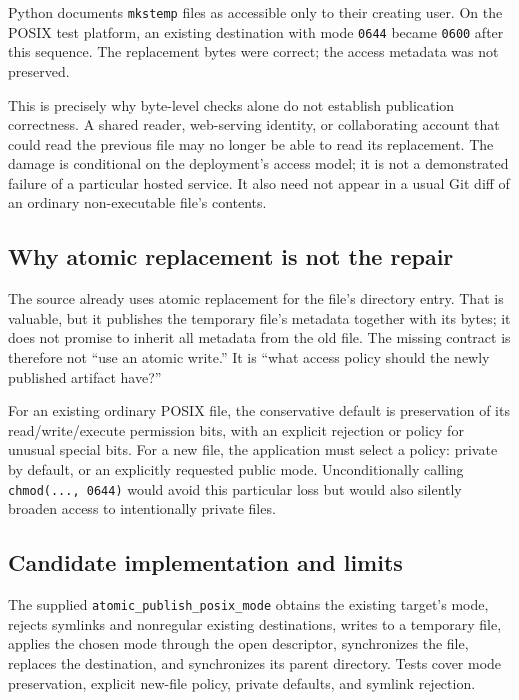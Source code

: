 \documentclass[11pt,letterpaper]{article}
\newcommand{\code}[1]{\nolinkurl{#1}}
\begin{document}
Python documents \code{mkstemp} files as accessible only to their creating user.
On the POSIX test platform, an existing destination with mode \code{0644}
became \code{0600} after this sequence. The replacement bytes were correct; the
access metadata was not preserved.\cite{pytemp}

This is precisely why byte-level checks alone do not establish publication
correctness. A shared reader, web-serving identity, or collaborating account
that could read the previous file may no longer be able to read its
replacement. The damage is conditional on the deployment's access model; it is
not a demonstrated failure of a particular hosted service. It also need not
appear in a usual Git diff of an ordinary non-executable file's contents.

\subsection{Why atomic replacement is not the repair}

The source already uses atomic replacement for the file's directory entry.
That is valuable, but it publishes the temporary file's metadata together with
its bytes; it does not promise to inherit all metadata from the old
file.\cite{pyos} The missing contract is therefore not ``use an atomic write.''
It is ``what access policy should the newly published artifact have?''

For an existing ordinary POSIX file, the conservative default is preservation
of its read/write/execute permission bits, with an explicit rejection or policy
for unusual special bits. For a new file, the application must select a policy:
private by default, or an explicitly requested public mode. Unconditionally
calling \code{chmod(..., 0644)} would avoid this particular loss but would also
silently broaden access to intentionally private files.

\subsection{Candidate implementation and limits}

The supplied \code{atomic_publish_posix_mode} obtains the existing target's mode,
rejects symlinks and nonregular existing destinations, writes to a temporary
file, applies the chosen mode through the open descriptor, synchronizes the
file, replaces the destination, and synchronizes its parent directory. Tests
cover mode preservation, explicit new-file policy, private defaults, and
symlink rejection.
\end{document}
